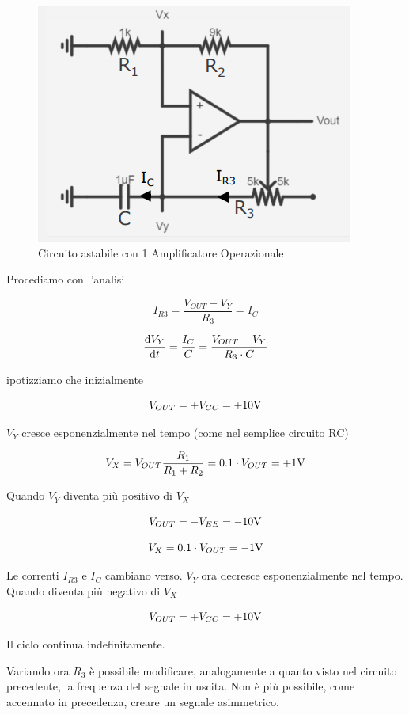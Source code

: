\documentclass{article}
\begin{document}
\begin{figure}[h]
  \centering
  \includegraphics[scale=0.48]{IM_circuito_astabile_bis}
  \caption{Circuito astabile con 1 Amplificatore Operazionale}
  \label{Schema_circuito_astabile_bis}
\end{figure}

Procediamo con l'analisi

\[I_{R3} = \frac{V_{OUT} - V_Y}{R_3} = I_C\]

\[\frac{\textrm d V_Y}{\textrm d t} = \frac{I_C}{C} = \frac{V_{OUT} - V_Y}{R_3 \cdot C}\]

ipotizziamo che inizialmente

\[V_{OUT} = + V_{CC} = + 10 \textrm V\]

$V_Y$ cresce esponenzialmente nel tempo (come nel semplice circuito RC)

\[V_X = V_{OUT} \frac{R_1}{R_1 + R_2} = 0.1 \cdot V_{OUT} = + 1 \textrm V\]

Quando $V_Y$ diventa più positivo di $V_X$

\[V_{OUT} = - V_{EE} = - 10 \textrm V\]

\[V_X = 0.1 \cdot V_{OUT} = - 1 \textrm V\]

Le correnti $I_{R3}$ e $I_C$ cambiano verso. $V_Y$ ora decresce esponenzialmente nel tempo. Quando diventa più negativo di $V_X$

\[V_{OUT} = + V_{CC} = + 10 \textrm V\]

Il ciclo continua indefinitamente.

\vspace{3mm}

Variando ora $R_3$ è possibile modificare, analogamente a quanto visto nel circuito precedente, la frequenza del segnale in uscita. Non è più possibile, come accennato in precedenza, creare un segnale asimmetrico.
\end{document}
